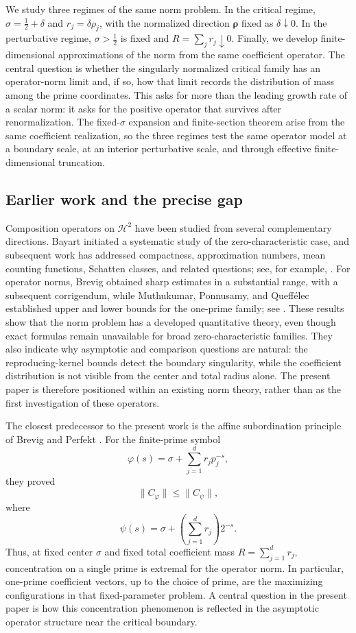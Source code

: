 \documentclass[12pt, reqno]{amsart}
\numberwithin{equation}{section}
\begin{document}
We study three regimes of the same norm problem.  In the critical regime,
\(\sigma=\frac12+\delta\) and \(r_j=\delta\rho_j\), with the normalized
direction \(\boldsymbol\rho\) fixed as \(\delta\downarrow0\).  In the
perturbative regime, \(\sigma>\frac12\) is fixed and
\(R=\sum_jr_j\downarrow0\).  Finally, we develop finite-dimensional
approximations of the norm from the same  coefficient operator.  The central
question is whether the singularly normalized critical family has an
operator-norm limit and, if so, how that limit records the distribution of
mass among the prime coordinates.  This asks for more than the leading
growth rate of a scalar norm: it asks for the positive operator that
survives after renormalization.  The fixed-\(\sigma\) expansion and
finite-section theorem arise from the same coefficient realization, so the
three regimes test the same operator model at a boundary scale, at an
interior perturbative scale, and through effective finite-dimensional
truncation.
\subsection{Earlier work and the precise gap}

Composition operators on $\mathcal H^2$ have been studied from several
complementary directions. Bayart initiated a systematic study of the
zero-characteristic case, and subsequent work has addressed compactness,
approximation numbers, mean counting functions, Schatten classes, and
related questions; see, for example,
\cite{Ba,Ba2,CQV,BP2,AP,AK,BA}. For operator norms, Brevig obtained
sharp estimates in a substantial range, with a subsequent corrigendum,
while Muthukumar, Ponnusamy, and Queff\'elec established upper and lower
bounds for the one-prime family; see
\cite{Brevig,Brevig2023,MPQ}. These results show that the
norm problem has a developed quantitative theory, even though exact
formulas remain unavailable for broad zero-characteristic families.  They
also indicate why asymptotic and comparison questions are natural: the
reproducing-kernel bounds detect the boundary singularity, while the
coefficient distribution is not visible from the center and total radius
alone.  The present paper is therefore positioned within an existing norm
theory, rather than as the first investigation of these operators.

The closest predecessor to the present work is the affine
subordination principle of Brevig and Perfekt \cite{BP1}. For the
finite-prime symbol
\[
\varphi(s)
=
\sigma+\sum_{j=1}^d r_jp_j^{-s},
\]
they proved
\[
\|C_\varphi\|
\leq
\|C_\psi\|,
\]
where
\[
\psi(s)
=
\sigma+
\left(\sum_{j=1}^d r_j\right)2^{-s}.
\]
Thus, at fixed center $\sigma$ and fixed total coefficient mass
$R=\sum_{j=1}^d r_j,$
concentration on a single prime is extremal for the operator norm. In particular,
one-prime coefficient vectors, up to the choice of prime, are the
maximizing configurations in that fixed-parameter problem. A central question in the present paper is how this concentration phenomenon is reflected in the asymptotic operator structure near the critical boundary.
\end{document}
